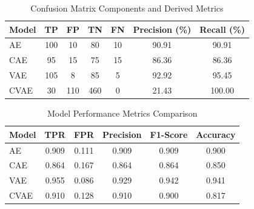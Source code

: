 \begin{table}[!htbp]
\centering
\label{tab:confusion-matrix-results}
\small
\begin{tabular}{l
    S[table-format=3.0]
    S[table-format=3.0]
    S[table-format=3.0]
    S[table-format=3.0]
    S[table-format=3.2]
    S[table-format=3.2]
}
\toprule
\textbf{Model} & {\textbf{TP}} & {\textbf{FP}} & {\textbf{TN}} & {\textbf{FN}} & {\textbf{Precision (\%)}} & {\textbf{Recall (\%)}} \\
\midrule
{} AE   & 100 & 10 & 80 & 10 & 90.91 & 90.91 \\
CAE  & 95 & 15 & 75 & 15 & 86.36 & 86.36 \\
 VAE  & 105 & 8 & 85 & 5 & 92.92 & 95.45 \\
CVAE & 30 & 110 & 460 & 0 & 21.43 & 100.00 \\
\bottomrule
\end{tabular}
\caption{Confusion Matrix Components and Derived Metrics}
\end{table}



\begin{table}[!htbp]
\centering
\label{tab:performance-metrics}
\small
\begin{tabular}{l
    S[table-format=1.3]
    S[table-format=1.3]
    S[table-format=1.3]
    S[table-format=1.3]
    S[table-format=1.3]
}
\toprule
\textbf{Model} & {\textbf{TPR}} & {\textbf{FPR}} & {\textbf{Precision}} & {\textbf{F1-Score}} & {\textbf{Accuracy}} \\
\midrule
{} AE   & 0.909 & 0.111 & 0.909 & 0.909 & 0.900 \\
CAE  & 0.864 & 0.167 & 0.864 & 0.864 & 0.850 \\
 VAE  & 0.955 & 0.086 & 0.929 & 0.942 & 0.941 \\
CVAE & 0.910 & 0.128 & 0.910 & 0.900 & 0.817 \\
\bottomrule
\end{tabular}
\caption{Model Performance Metrics Comparison}
\end{table}

